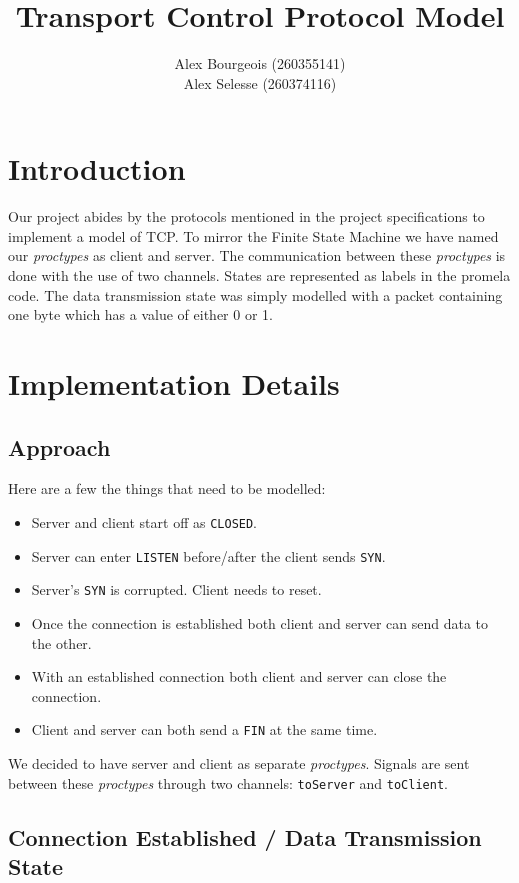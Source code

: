 \documentclass{WigReport}
\title{Transport Control Protocol Model}
\author{Alex Bourgeois (260355141) \\
 Alex Selesse (260374116)}
\begin{document}
\MakeTitlePage
\tableofcontents
\clearpage

\section{Introduction}

Our project abides by the protocols mentioned in the project specifications to implement a model of TCP. To mirror the Finite State Machine we have named our \textit{proctypes} as client and server. The communication between these \textit{proctypes} is done with the use of two channels. States are represented as labels in the promela code. The data transmission state was simply modelled with a packet containing one byte which has a value of either 0 or 1.

\section{Implementation Details}

\subsection{Approach}

Here are a few the things that need to be modelled:
\begin{itemize}
\item Server and client start off as \verb|CLOSED|.
\item Server can enter \verb|LISTEN| before/after the client sends \verb|SYN|.
\item Server's \verb|SYN| is corrupted. Client needs to reset.
\item Once the connection is established both client and server can send data to the other.
\item With an established connection both client and server can close the connection.
\item Client and server can both send a \verb|FIN| at the same time.
\end{itemize}

We decided to have server and client as separate \textit{proctypes}. Signals
are sent between these \textit{proctypes} through two channels:
\verb|toServer| and \verb|toClient|.

\subsection{Connection Established / Data Transmission State}
\end{document}
